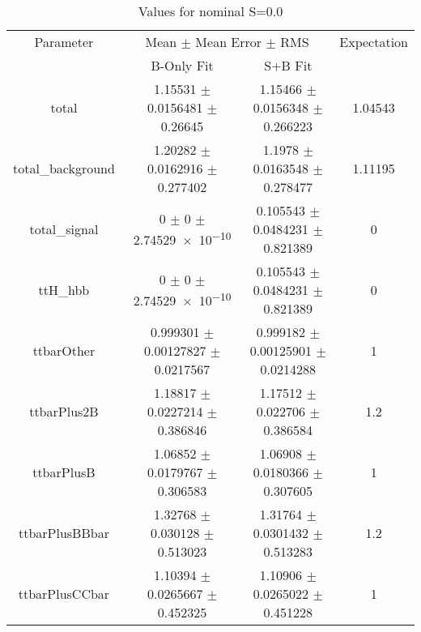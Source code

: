 \begin{table}
\centering
\caption{Values for nominal S=0.0}
\begin{tabular}{cccc}
\toprule
Parameter & \multicolumn{2}{c}{Mean $\pm$ Mean Error $\pm$ RMS} & Expectation\\
 & B-Only Fit & S+B Fit & \\
\midrule
total & \num{1.15531} $\pm$ \num{0.0156481} $\pm$ \num{0.26645} & \num{1.15466} $\pm$ \num{0.0156348} $\pm$ \num{0.266223} & \num{1.04543}\\
total\_background & \num{1.20282} $\pm$ \num{0.0162916} $\pm$ \num{0.277402} & \num{1.1978} $\pm$ \num{0.0163548} $\pm$ \num{0.278477} & \num{1.11195}\\
total\_signal & \num{0} $\pm$ \num{0} $\pm$ \num{2.74529e-10} & \num{0.105543} $\pm$ \num{0.0484231} $\pm$ \num{0.821389} & \num{0}\\
ttH\_hbb & \num{0} $\pm$ \num{0} $\pm$ \num{2.74529e-10} & \num{0.105543} $\pm$ \num{0.0484231} $\pm$ \num{0.821389} & \num{0}\\
ttbarOther & \num{0.999301} $\pm$ \num{0.00127827} $\pm$ \num{0.0217567} & \num{0.999182} $\pm$ \num{0.00125901} $\pm$ \num{0.0214288} & \num{1}\\
ttbarPlus2B & \num{1.18817} $\pm$ \num{0.0227214} $\pm$ \num{0.386846} & \num{1.17512} $\pm$ \num{0.022706} $\pm$ \num{0.386584} & \num{1.2}\\
ttbarPlusB & \num{1.06852} $\pm$ \num{0.0179767} $\pm$ \num{0.306583} & \num{1.06908} $\pm$ \num{0.0180366} $\pm$ \num{0.307605} & \num{1}\\
ttbarPlusBBbar & \num{1.32768} $\pm$ \num{0.030128} $\pm$ \num{0.513023} & \num{1.31764} $\pm$ \num{0.0301432} $\pm$ \num{0.513283} & \num{1.2}\\
ttbarPlusCCbar & \num{1.10394} $\pm$ \num{0.0265667} $\pm$ \num{0.452325} & \num{1.10906} $\pm$ \num{0.0265022} $\pm$ \num{0.451228} & \num{1}\\
\bottomrule
\end{tabular}
\end{table}